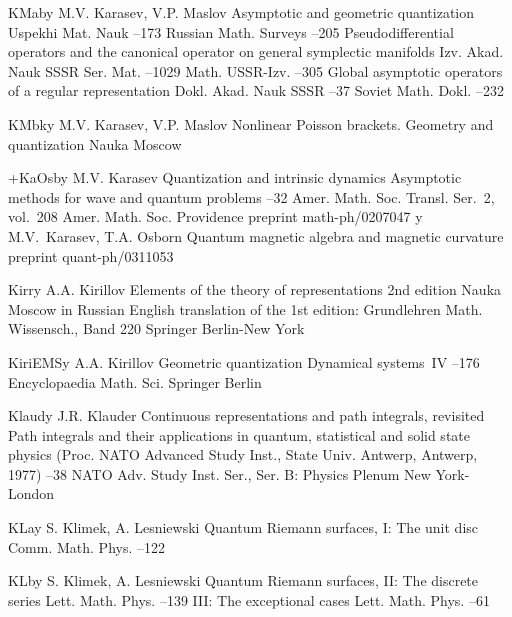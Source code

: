 \documentclass[11pt]{amsart}
\numberwithin{equation}{section}
\theoremstyle{remark}
\newcommand{\by}{\mathbf y}
\begin{document}
\begin{thebibliography}{199}
 KMab\by{ M.V. Karasev, V.P. Maslov \paper Asymptotic and geometric
quantization \jour Uspekhi Mat. Nauk   --173
\transl Russian Math. Surveys   --205 \moreref
\paper Pseudodifferential operators and the canonical operator on general
symplectic manifolds \jour Izv. Akad. Nauk SSSR Ser. Mat.  
--1029 \transl Math. USSR-Izv.   --305
\moreref \paper Global asymptotic operators of a regular representation \jour
Dokl. Akad. Nauk SSSR   --37 \transl \jour Soviet
Math. Dokl.   --232}

 KMbk\by{ M.V. Karasev, V.P. Maslov \book Nonlinear Poisson brackets.
Geometry and quantization \publ Nauka \publaddr Moscow }

 +KaOsb\by{ M.V. Karasev \paper Quantization and intrinsic dynamics
\inbook Asymptotic methods for wave and quantum problems --32 \bookinfo
Amer. Math. Soc. Transl. Ser.~2, vol.~208 \publ Amer. Math. Soc. \publaddr
Providence  \paperinfo preprint math-ph/0207047 \moreref \by
M.V.~Karasev, T.A. Osborn \paper Quantum magnetic algebra and magnetic
curvature \paperinfo preprint quant-ph/0311053}

 Kirr\by{ A.A. Kirillov \book Elements of the theory of representations
\bookinfo 2nd edition \publ Nauka \publaddr Moscow  \lang in Russian
\transl English translation of the 1st edition: Grundlehren Math. Wissensch.,
Band 220 \publ Springer \publaddr Berlin-New York }

 KiriEMS\by{ A.A. Kirillov \paper Geometric quantization \inbook
Dynamical systems~IV --176 \bookinfo Encyclopaedia Math. Sci.
 \publ Springer \publaddr Berlin }

 Klaud\by{ J.R. Klauder \paper Continuous representations and path
integrals, revisited \inbook Path integrals and their applications in quantum,
statistical and solid state physics (Proc. NATO Advanced Study Inst., State
Univ. Antwerp, Antwerp, 1977) --38 \bookinfo NATO Adv. Study Inst.
Ser., Ser. B: Physics  \publ Plenum \publaddr New York-London }

 KLa\by{ S. Klimek, A. Lesniewski \paper Quantum Riemann surfaces, I: The
unit disc \jour Comm. Math. Phys.   --122}

 KLb\by{ S. Klimek, A. Lesniewski \paper Quantum Riemann surfaces, II: The
discrete series \jour Lett. Math. Phys.   --139
\moreref \paper III: The exceptional cases \jour Lett. Math. Phys.   --61}


\end{thebibliography}
\end{document}
